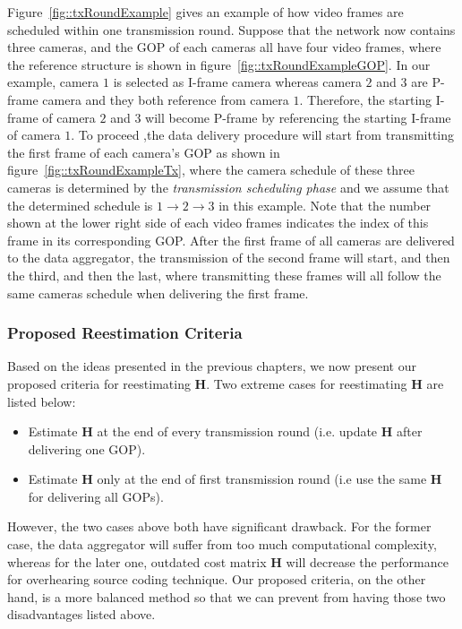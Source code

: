 {Figure~\ref{fig::txRoundExample} gives an example of how video frames are scheduled within one transmission round.
Suppose that the network now contains three cameras, and the GOP of each cameras all have four video frames, where the reference structure is shown in figure~\ref{fig::txRoundExampleGOP}.
In our example, camera $1$ is selected as I-frame camera whereas camera $2$ and $3$ are P-frame camera and they both reference from camera $1$.
Therefore, the starting I-frame of camera $2$ and $3$ will become P-frame by referencing the starting I-frame of camera $1$.
To proceed ,the data delivery procedure will start from transmitting the first frame of each camera's GOP as shown in figure~\ref{fig::txRoundExampleTx}, where the camera schedule of these three cameras is determined by the \emph{transmission scheduling phase} and we assume that the determined schedule is $1 \rightarrow 2 \rightarrow 3$ in this example.
Note that the number shown at the lower right side of each video frames indicates the index of this frame in its corresponding GOP.
After the first frame of all cameras are delivered to the data aggregator, the transmission of the second frame will start, and then the third, and then the last, where transmitting these frames will all follow the same cameras schedule when delivering the first frame.
%
\subsubsection{Proposed Reestimation Criteria}
Based on the ideas presented in the previous chapters, we now present our proposed criteria for reestimating $\mathbf{H}$.
Two extreme cases for reestimating $\mathbf{H}$ are listed below:
\begin{itemize}
\item Estimate $\mathbf{H}$ at the end of every transmission round (i.e. update $\mathbf{H}$ after delivering one GOP).
\item Estimate $\mathbf{H}$ only at the end of first transmission round (i.e use the same $\mathbf{H}$ for delivering all GOPs).
\end{itemize}
However, the two cases above both have significant drawback.
For the former case, the data aggregator will suffer from too much computational complexity, whereas for the later one, outdated cost matrix $\mathbf{H}$ will decrease the performance for overhearing source coding technique.
Our proposed criteria, on the other hand, is a more balanced method so that we can prevent from having those two disadvantages listed above.

}

